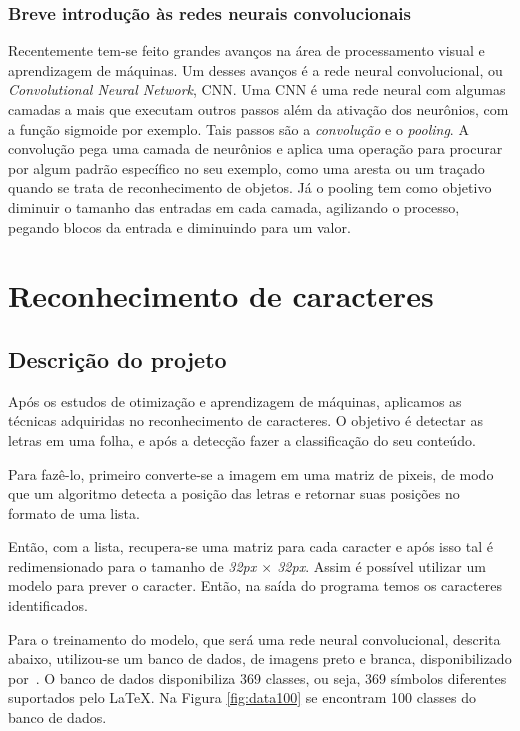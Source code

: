 \documentclass[
	12pt,				%
    oneside,			%
	a4paper,			%
	english,			%
	french,				%
	spanish,			%
	brazil,				%
	]{abntex2}
\begin{document}
        \subsection{Breve introdução às  redes neurais convolucionais}
            Recentemente tem-se feito grandes avanços na área de processamento visual e aprendizagem de máquinas. Um desses avanços é a rede neural convolucional, ou \emph{Convolutional Neural Network}, CNN. Uma CNN é uma rede neural com algumas camadas a mais que executam outros passos além da ativação dos neurônios, com a função sigmoide por exemplo. Tais passos são a \emph{convolução} e o \emph{pooling}. A convolução pega uma camada de neurônios e aplica uma operação para procurar por algum padrão específico no seu exemplo, como uma aresta ou um traçado quando se trata de reconhecimento de objetos. Já o pooling tem como objetivo diminuir o tamanho das entradas em cada camada, agilizando o processo, pegando blocos da entrada e diminuindo para um valor.

\chapter{Reconhecimento de caracteres}
    \section{Descrição do projeto}
        Após os estudos de otimização e aprendizagem de máquinas, aplicamos as técnicas adquiridas no reconhecimento de caracteres. O objetivo é detectar as letras em uma folha, e após a detecção fazer a classificação do seu conteúdo.

        Para fazê-lo, primeiro converte-se a imagem em uma matriz de pixeis, de modo que um algoritmo detecta a posição das letras e retornar suas posições no formato de uma lista.

        Então, com a lista, recupera-se uma matriz para cada caracter e após isso tal é redimensionado para o tamanho de \emph{32px $\times$ 32px}.
        Assim é possível utilizar um modelo para prever o caracter. Então, na saída do programa temos os caracteres identificados.

        Para o treinamento do modelo, que será uma rede neural convolucional, descrita abaixo, utilizou-se um banco de dados, de imagens preto e branca, disponibilizado por~\cite{thomadata}. O banco de dados disponibiliza 369 classes, ou seja, 369 símbolos diferentes suportados pelo \LaTeX.
        Na Figura \ref{fig:data100} se encontram 100 classes do banco de dados.
\end{document}
